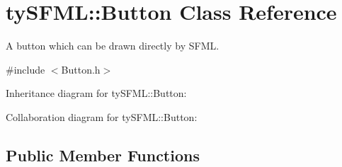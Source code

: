 \hypertarget{classty_s_f_m_l_1_1_button}{}\section{ty\+S\+F\+M\+L\+:\+:Button Class Reference}
\label{classty_s_f_m_l_1_1_button}


A button which can be drawn directly by S\+F\+M\+L.  




{\ttfamily \#include $<$Button.\+h$>$}



Inheritance diagram for ty\+S\+F\+M\+L\+:\+:Button\+:


Collaboration diagram for ty\+S\+F\+M\+L\+:\+:Button\+:
\subsection*{Public Member Functions}
